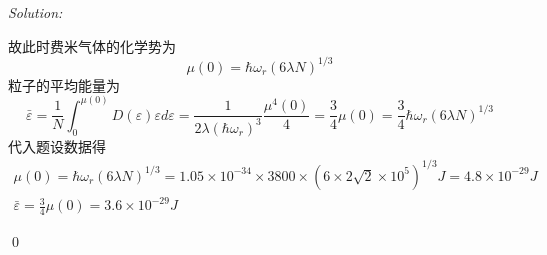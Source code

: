\documentclass[12pt,a4paper]{article}
\newenvironment{sol}
    {\emph{Solution:}
    }
    {
    \qed
    }
\begin{document}
\begin{sol}
\begin{equation}
\end{equation}
故此时费米气体的化学势为
\begin{equation}
\mu(0)=\hbar\omega_r(6\lambda N)^{1/3}
\end{equation}
粒子的平均能量为
\begin{equation}
\bar{\varepsilon}=\frac{1}{N}\int_0^{\mu(0)}D(\varepsilon)\varepsilon d\varepsilon=\frac{1}{2\lambda(\hbar\omega_r)^3}\frac{\mu^4(0)}{4}=\frac{3}{4}\mu(0)=\frac{3}{4}\hbar\omega_r(6\lambda N)^{1/3}
\end{equation}
代入题设数据得
\begin{gather}
\mu(0)=\hbar\omega_r(6\lambda N)^{1/3}=1.05\times10^{-34}\times3800\times(6\times2\sqrt{2}\times10^{5})^{1/3}J=4.8\times10^{-29}J\\
\bar{\varepsilon}=\frac{3}{4}\mu(0)=3.6\times10^{-29}J
\end{gather}
\end{sol}
\end{document}

